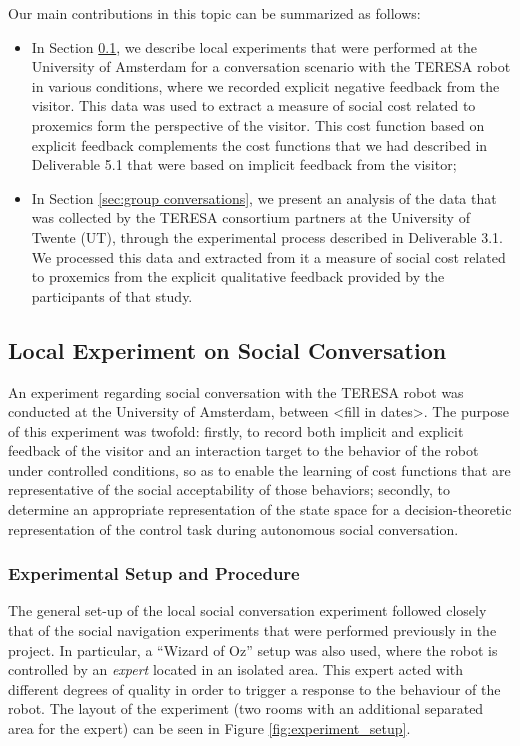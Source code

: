 \documentclass[a4paper,11pt]{report}
\begin{document}
Our main contributions in this topic can be summarized as follows:
\begin{itemize}
\item In Section \ref{sec:initial_experiment}, we describe local experiments that were performed at the University of Amsterdam for a conversation scenario with the TERESA robot in various conditions, where we recorded explicit negative feedback from the visitor. This data was used to extract a measure of social cost related to proxemics form the perspective of the visitor. This cost function based on explicit feedback complements the cost functions that we had described in Deliverable 5.1 that were based on implicit feedback from the visitor;
\item In Section \ref{sec:group conversations}, we present an analysis of the data that was collected by the TERESA consortium partners at the University of Twente (UT), through the experimental process described in Deliverable 3.1. We processed this data and extracted from it a measure of social cost related to proxemics from the explicit qualitative feedback provided by the participants of that study.
\end{itemize}

\subsection{Local Experiment on Social Conversation}
\label{sec:initial_experiment}

An experiment regarding social conversation with the TERESA robot was conducted at the University of Amsterdam, between <fill in dates>. The purpose of this experiment was twofold: firstly, to record both implicit and explicit feedback of the visitor and an interaction target to the behavior of the robot under controlled conditions, so as to enable the learning of cost functions that are representative of the social acceptability of those behaviors; secondly, to determine an appropriate representation of the state space for a decision-theoretic representation of the control task during autonomous social conversation.

\subsubsection{Experimental Setup and Procedure}

The general set-up of the local social conversation experiment followed closely that of the social navigation experiments that were performed previously in the project. In particular, a ``Wizard of Oz'' setup was also used, where the robot is controlled by an \textit{expert} located in an isolated area. This expert acted with different degrees of quality in order to trigger a response to the behaviour of the robot. The layout of the experiment (two rooms with an additional separated area for the expert) can be seen in Figure \ref{fig:experiment_setup}.
\end{document}
